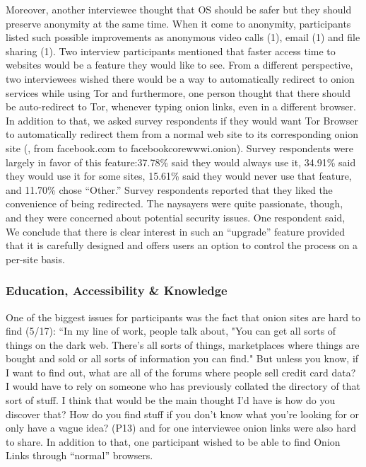 Moreover, another interviewee thought that OS should be safer but they should preserve anonymity at the same time. When it come to anonymity, participants listed such possible improvements as anonymous video calls (1), email (1) and file sharing (1). Two interview participants mentioned that faster access time to websites would be a feature they would like to see. From a different perspective, two interviewees wished there would be a way to automatically redirect to onion services while using Tor and furthermore, one person thought that there should be auto-redirect to Tor, whenever typing onion links, even in a different browser. In addition to that, we asked survey respondents if they would want Tor Browser to automatically redirect them from
a normal web site to its corresponding onion site (\eg, from facebook.com to
facebookcorewwwi.onion). Survey respondents were largely
in favor of this feature:37.78\% said they would always use it, 34.91\% said
they would use it for some sites, 15.61\% said they would never use that feature,   and
11.70\% chose ``Other.'' Survey respondents reported that they liked the convenience of being redirected.
The naysayers were quite passionate, though, and they were concerned about
potential security issues. One respondent said, 
We conclude that there is clear interest in such an ``upgrade'' feature provided
that it is carefully designed and offers users an option to control the process
on a per-site basis.


\subsubsection{Education, Accessibility \& Knowledge}

One of the biggest issues for participants was the fact that onion sites are hard to find (5/17): “In my line of work, people talk about, "You can get all sorts of things on the dark web. There's all sorts of things, marketplaces where things are bought and sold or all sorts of information you can find." But unless you know, if I want to find out, what are all of the forums where people sell credit card data? I would have to rely on someone who has previously collated the directory of that sort of stuff. I think that would be the main thought I'd have is how do you discover that? How do you find stuff if you don't know what you're looking for or only have a vague idea? (P13) and for one interviewee onion links were also hard to share.  In addition to that, one participant wished to be able to find Onion Links through “normal” browsers. 

